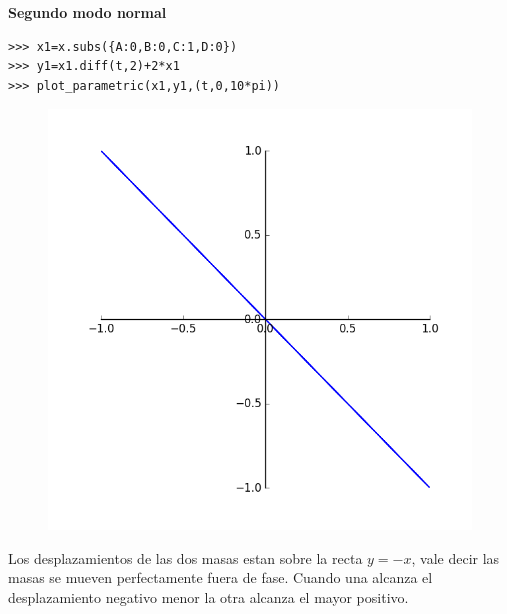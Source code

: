  \begin{center}
 \end{center}





\noindent\textbf{Segundo modo normal}

\begin{lstlisting}
>>> x1=x.subs({A:0,B:0,C:1,D:0})
>>> y1=x1.diff(t,2)+2*x1
>>> plot_parametric(x1,y1,(t,0,10*pi))
\end{lstlisting}

\begin{figure}
  \begin{center}
   \vspace{-.5cm}\includegraphics[scale=.2]{imagenes/modo_normal2.png}
 \end{center}
\end{figure}
Los desplazamientos de las dos masas estan sobre la recta $y=-x$, vale decir las masas se mueven perfectamente fuera de fase. Cuando una alcanza el desplazamiento negativo menor la otra alcanza el mayor positivo.


 \begin{center}
 \end{center}



